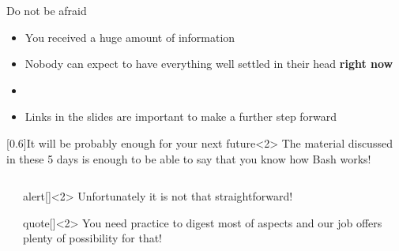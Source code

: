 \begin{frame}{Do not be afraid}
    \vspace{-4mm}
    \begin{itemize}
        \item \alert{You received a huge amount of information}
        \item Nobody can expect to have everything well settled in their head \textbf{right now}
        \item {}
        \item Links in the slides are important to make a further step forward
    \end{itemize}
    \vspace{-2mm}
    \begin{varblock}{}[0.6\textwidth]{It will be probably enough for your next future}<2>
        The material discussed in these 5 days is enough to be able to say that you know how Bash works!
    \end{varblock}
    \vspace{5mm}
    \begin{columns}[c]
        \begin{column}{0.3\textwidth}
        \end{column}
        \begin{column}{0.5\textwidth}
            \begin{varblock}{alert}[\textwidth]{}<2>
                \alert{Unfortunately it is not that straightforward!}
            \end{varblock}
            \begin{varblock}{quote}[\textwidth]{}<2>
                \normalfont
                You need practice to digest most of aspects and our job offers plenty of possibility for that!
            \end{varblock}
        \end{column}
    \end{columns}
\end{frame}
